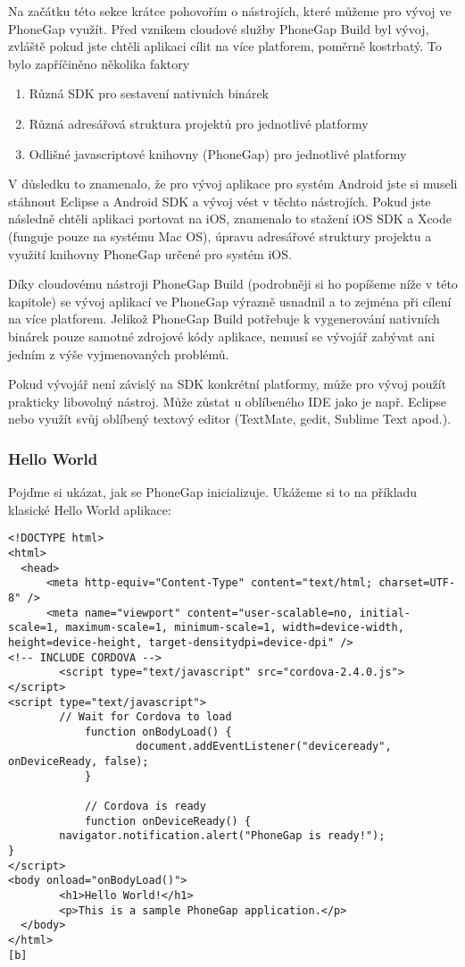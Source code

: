 Na začátku této sekce krátce pohovořím o nástrojích, které můžeme pro vývoj ve PhoneGap využít. Před vznikem cloudové služby PhoneGap Build byl vývoj, zvláště pokud jste chtěli aplikaci cílit na více platforem, poměrně kostrbatý. To bylo zapříčiněno několika faktory

\begin{enumerate}
  \item Různá SDK pro sestavení nativních binárek
  \item Různá adresářová struktura projektů pro jednotlivé platformy
  \item Odlišné javascriptové knihovny (PhoneGap) pro jednotlivé platformy
\end{enumerate}

V důsledku to znamenalo, že pro vývoj aplikace pro systém Android jste si museli stáhnout Eclipse a Android SDK a vývoj vést v těchto nástrojích. Pokud jste následně chtěli aplikaci portovat na iOS, znamenalo to stažení iOS SDK a Xcode (funguje pouze na systému Mac OS), úpravu adresářové struktury projektu a využití knihovny PhoneGap určené pro systém iOS.

Díky cloudovému nástroji PhoneGap Build (podrobněji si ho popíšeme níže v této kapitole) se vývoj aplikací ve PhoneGap výrazně usnadnil a to zejména při cílení na více platforem. Jelikož PhoneGap Build potřebuje k vygenerování nativních binárek pouze samotné zdrojové kódy aplikace, nemusí se vývojář zabývat ani jedním z výše vyjmenovaných problémů.

Pokud vývojář není závislý na SDK konkrétní platformy, může pro vývoj použít prakticky libovolný nástroj. Může zůstat u oblíbeného IDE jako je např. Eclipse nebo využít svůj oblíbený textový editor (TextMate, gedit, Sublime Text apod.).

\subsubsection{Hello World}
Pojďme si ukázat, jak se PhoneGap inicializuje. Ukážeme si to na příkladu klasické Hello World aplikace:

\begin{verbatim}
<!DOCTYPE html>
<html>
  <head>
      <meta http-equiv="Content-Type" content="text/html; charset=UTF-8" />
      <meta name="viewport" content="user-scalable=no, initial-scale=1, maximum-scale=1, minimum-scale=1, width=device-width, height=device-height, target-densitydpi=device-dpi" />
<!-- INCLUDE CORDOVA -->
        <script type="text/javascript" src="cordova-2.4.0.js"></script>
<script type="text/javascript">
        // Wait for Cordova to load
            function onBodyLoad() {
                    document.addEventListener("deviceready", onDeviceReady, false);
            }
            
            // Cordova is ready
            function onDeviceReady() {
        navigator.notification.alert("PhoneGap is ready!");
}
</script>
<body onload="onBodyLoad()">
        <h1>Hello World!</h1>
        <p>This is a sample PhoneGap application.</p>
  </body>
</html>
[b]
\end{verbatim}


